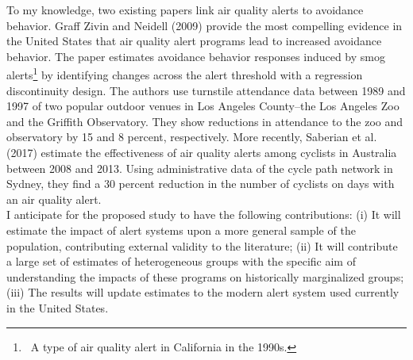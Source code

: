 \documentclass[12pt]{article}
\begin{document}
To my knowledge, two existing papers link air quality alerts to avoidance behavior. Graff Zivin and Neidell (2009) provide the most compelling evidence in the United States that air quality alert programs lead to increased avoidance behavior. The paper estimates avoidance behavior responses induced by smog alerts\footnote{~A type of air quality alert in California in the 1990s.} by identifying changes across the alert threshold with a regression discontinuity design. The authors use turnstile attendance data between 1989 and 1997 of two popular outdoor venues in Los Angeles County--the Los Angeles Zoo and the Griffith Observatory. They show reductions in attendance to the zoo and observatory by 15 and 8 percent, respectively. 
More recently, Saberian et al. (2017) estimate the effectiveness of air quality alerts among cyclists in Australia between 2008 and 2013. Using administrative data of the cycle path network in Sydney, they find a 30 percent reduction in the number of cyclists on days with an air quality alert. \\

I anticipate for the proposed study to have the following contributions: (i) It will estimate the impact of alert systems upon a more general sample of the population, contributing external validity to the literature; (ii) It will contribute a large set of estimates of heterogeneous groups with the specific aim of understanding the impacts of these programs on historically marginalized groups; (iii) The results will update estimates to the modern alert system used currently in the United States. \\
\end{document}
